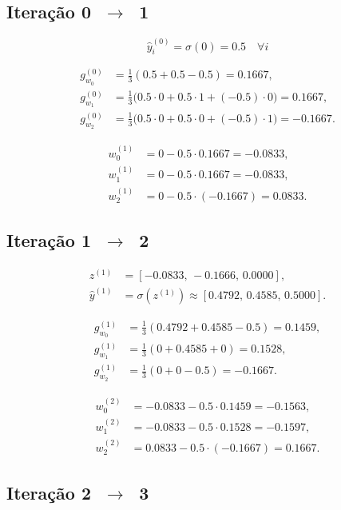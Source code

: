 \documentclass[12pt]{article}
\begin{document}
\subsection*{Iteração 0 $\;\rightarrow\;$ 1}

\[
\hat{y}_i^{(0)} = \sigma(0) = 0.5 \quad\forall i
\]

\[
\begin{aligned}
g_{w_0}^{(0)} &= \tfrac13(0.5 + 0.5 - 0.5) = 0.1667, \\
g_{w_1}^{(0)} &= \tfrac13\bigl(0.5\!\cdot\!0 + 0.5\!\cdot\!1 + (-0.5)\!\cdot\!0\bigr) = 0.1667, \\
g_{w_2}^{(0)} &= \tfrac13\bigl(0.5\!\cdot\!0 + 0.5\!\cdot\!0 + (-0.5)\!\cdot\!1\bigr) = -0.1667.
\end{aligned}
\]

\[
\boxed{
\begin{aligned}
w_0^{(1)} &= 0 - 0.5\cdot 0.1667 = -0.0833,\\
w_1^{(1)} &= 0 - 0.5\cdot 0.1667 = -0.0833,\\
w_2^{(1)} &= 0 - 0.5\cdot (-0.1667) = 0.0833.
\end{aligned}}
\]

\subsection*{Iteração 1 $\;\rightarrow\;$ 2}

\[
\begin{aligned}
z^{(1)} &= [-0.0833,\,-0.1666,\,0.0000],\\
\hat{y}^{(1)} &= \sigma(z^{(1)}) \approx [0.4792,\,0.4585,\,0.5000].
\end{aligned}
\]

\[
\begin{aligned}
g_{w_0}^{(1)} &= \tfrac13(0.4792 + 0.4585 - 0.5) = 0.1459,\\
g_{w_1}^{(1)} &= \tfrac13(0\!+\!0.4585\!+\!0) = 0.1528,\\
g_{w_2}^{(1)} &= \tfrac13(0\!+\!0\!-\!0.5) = -0.1667.
\end{aligned}
\]

\[
\boxed{
\begin{aligned}
w_0^{(2)} &= -0.0833 - 0.5\cdot 0.1459 = -0.1563,\\
w_1^{(2)} &= -0.0833 - 0.5\cdot 0.1528 = -0.1597,\\
w_2^{(2)} &=  0.0833 - 0.5\cdot (-0.1667) = 0.1667.
\end{aligned}}
\]

\subsection*{Iteração 2 $\;\rightarrow\;$ 3}
\end{document}
